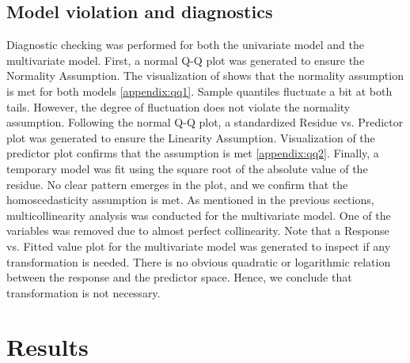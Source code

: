 \documentclass{article}
\begin{document}
\subsection{Model violation and diagnostics}
Diagnostic checking was performed for both the univariate model and the multivariate model. First, a normal Q-Q plot was generated to ensure the Normality Assumption. The visualization of shows that the normality assumption is met for both models \ref{appendix:qq1}. Sample quantiles fluctuate a bit at both tails. However, the degree of fluctuation does not violate the normality assumption. Following the normal Q-Q plot, a standardized Residue vs. Predictor plot was generated to ensure the Linearity Assumption. Visualization of the predictor plot confirms that the assumption is met \ref{appendix:qq2}. Finally, a temporary model was fit using the square root of the absolute value of the residue. No clear pattern emerges in the plot, and we confirm that the homoscedasticity assumption is met. As mentioned in the previous sections, multicollinearity analysis was conducted for the multivariate model. One of the variables was removed due to almost perfect collinearity. Note that a Response vs. Fitted value plot for the multivariate model was generated to inspect if any transformation is needed. There is no obvious quadratic or logarithmic relation between the response and the predictor space. Hence, we conclude that transformation is not necessary.

\section{Results}
\end{document}
